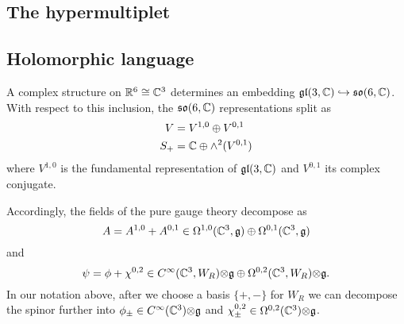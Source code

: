 \documentclass[10pt, oneside]{article}
\def\tensor{{\otimes}}
\begin{document}
\subsection{The hypermultiplet}

\subsection{Holomorphic language}

A complex structure on $\mathbb{R}^6 \cong \mathbb{C}^3$ determines an embedding $\mathfrak{gl} (3, \mathbb{C}) \hookrightarrow \mathfrak{so} (6, \mathbb{C})$. 
With respect to this inclusion, the $\mathfrak{so}(6,\mathbb{C})$ representations split as
\begin{align*}
V & = V^{1,0} \oplus V^{0,1} \\
S_+ & = \mathbb{C} \oplus \wedge^2(V^{0,1})
\end{align*}
where $V^{1,0}$ is the fundamental representation of $\mathfrak{gl}(3, \mathbb{C})$ and $V^{0,1}$ its complex conjugate. 

Accordingly, the fields of the pure gauge theory decompose as
\[
A = A^{1,0} + A^{0,1} \in \Omega^{1,0}(\mathbb{C}^3, \mathfrak{g}) \oplus \Omega^{0,1}(\mathbb{C}^3, \mathfrak{g})
\]
and 
\[
\psi = \phi + \chi^{0,2} \in C^\infty(\CC^3, W_R) \tensor \mf g \oplus \Omega^{0,2}(\CC^3, W_R) \tensor \mf g .
\]
In our notation above, after we choose a basis $\{+,-\}$ for $W_R$ we can decompose the spinor further into $\phi_{\pm} \in C^\infty(\CC^3) \tensor \mf g$ and $\chi^{0,2}_{\pm} \in \Omega^{0,2}(\CC^3) \tensor \mf g$. 
\end{document}
